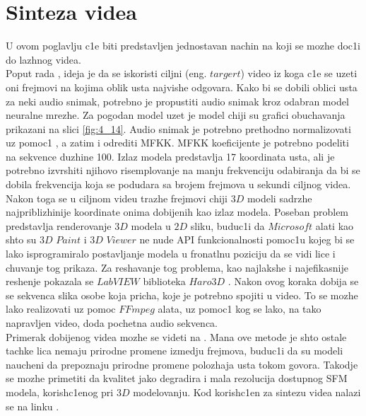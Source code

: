 \documentclass[a4paper, openany, oneside, 11pt]{book}
\begin{document}
\chapter{Sinteza videa}
U ovom poglavlju c1e biti predstavljen jednostavan nachin na koji se mozhe doc1i do lazhnog videa.\\ 
Poput rada \cite{deepfake2}, ideja je da se iskoristi ciljni (eng. $targert$) video iz koga c1e se uzeti oni frejmovi na kojima oblik usta najvishe odgovara. Kako bi se dobili oblici usta za neki audio snimak, potrebno je propustiti audio snimak kroz odabran model neuralne mrezhe. Za pogodan model uzet je model chiji su grafici obuchavanja prikazani na slici \ref{fig:4_14}. Audio snimak je potrebno prethodno normalizovati uz pomoc1 \cite{FFmpegN}, a zatim i odrediti \acrshort{MFKK}. \acrshort{MFKK} koeficijente je potrebno podeliti na sekvence duzhine 100. Izlaz modela predstavlja 17 koordinata usta, ali je potrebno izvrshiti njihovo risemplovanje na manju frekvenciju odabiranja da bi se dobila frekvencija koja se podudara sa brojem frejmova u sekundi ciljnog videa. Nakon toga se u ciljnom videu trazhe frejmovi chiji $3D$ modeli sadrzhe najpriblizhinije koordinate onima dobijenih kao izlaz modela. Poseban problem predstavlja renderovanje $3D$ modela u $2D$ sliku, buduc1i da $Microsoft$ alati kao shto su $3D$ $Paint$ i $3D$ $Viewer$ ne nude \acrshort{API} funkcionalnosti pomoc1u kojeg bi se lako isprogramiralo postavljanje modela u fronatlnu poziciju da se vidi lice i chuvanje tog prikaza. Za reshavanje tog problema, kao najlakshe i najefikasnije reshenje pokazala se $LabVIEW$ biblioteka $Haro3D$ \cite{Haro3D}. Nakon ovog koraka dobija se se sekvenca slika osobe koja pricha, koje je potrebno spojiti u video. To se mozhe lako realizovati uz pomoc $FFmpeg$ alata, uz pomoc1 kog se lako, na tako napravljen video, doda pochetna audio sekvenca.\\
Primerak dobijenog videa mozhe se videti na \cite{yt}. Mana ove metode je shto ostale tachke lica nemaju prirodne promene izmedju frejmova, buduc1i da su modeli naucheni da prepoznaju prirodne promene polozhaja usta tokom govora. Takodje se mozhe primetiti da kvalitet jako degradira i mala rezolucija dostupnog \acrshort{SFM} modela, korish\-c1enog pri $3D$ modelovanju. Kod korish\-c1en za sintezu videa nalazi se na linku \cite{gh1}.
\end{document}
